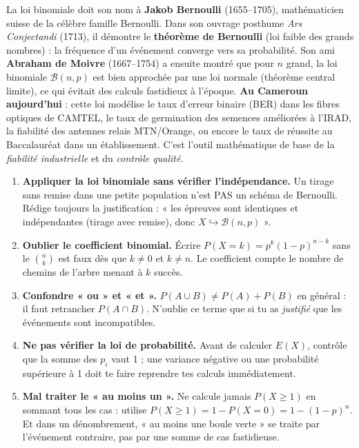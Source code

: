 \documentclass[11pt]{article}
\begin{document}
\begin{savaistu}
La loi binomiale doit son nom à \textbf{Jakob Bernoulli} (1655--1705), mathématicien suisse de la célèbre famille Bernoulli. Dans son ouvrage posthume \emph{Ars Conjectandi} (1713), il démontre le \textbf{théorème de Bernoulli} (loi faible des grands nombres) : la fréquence d'un événement converge vers sa probabilité.
Son ami \textbf{Abraham de Moivre} (1667--1754) a ensuite montré que pour $n$ grand, la loi binomiale $\mathcal{B}(n,p)$ est bien approchée par une loi normale (théorème central limite), ce qui évitait des calculs fastidieux à l'époque.
\textbf{Au Cameroun aujourd'hui} : cette loi modélise le taux d'erreur binaire (BER) dans les fibres optiques de CAMTEL, le taux de germination des semences améliorées à l'IRAD, la fiabilité des antennes relais MTN/Orange, ou encore le taux de réussite au Baccalauréat dans un établissement. C'est l'outil mathématique de base de la \emph{fiabilité industrielle} et du \emph{contrôle qualité}.
\end{savaistu}

\begin{attention}
\begin{enumerate}
\item \textbf{Appliquer la loi binomiale sans vérifier l'indépendance.} Un tirage sans remise dans une petite population n'est PAS un schéma de Bernoulli. Rédige toujours la justification : « les épreuves sont identiques et indépendantes (tirage avec remise), donc $X \hookrightarrow \mathcal{B}(n, p)$ ».
\item \textbf{Oublier le coefficient binomial.} Écrire $P(X = k) = p^k (1-p)^{n-k}$ sans le $\binom{n}{k}$ est faux dès que $k \neq 0$ et $k \neq n$. Le coefficient compte le nombre de chemins de l'arbre menant à $k$ succès.
\item \textbf{Confondre « ou » et « et ».} $P(A \cup B) \neq P(A) + P(B)$ en général : il faut retrancher $P(A \cap B)$. N'oublie ce terme que si tu as \emph{justifié} que les événements sont incompatibles.
\item \textbf{Ne pas vérifier la loi de probabilité.} Avant de calculer $E(X)$, contrôle que la somme des $p_i$ vaut 1 ; une variance négative ou une probabilité supérieure à 1 doit te faire reprendre tes calculs immédiatement.
\item \textbf{Mal traiter le « au moins un ».} Ne calcule jamais $P(X \geq 1)$ en sommant tous les cas : utilise $P(X \geq 1) = 1 - P(X = 0) = 1 - (1-p)^n$. Et dans un dénombrement, « au moins une boule verte » se traite par l'événement contraire, pas par une somme de cas fastidieuse.
\end{enumerate}
\end{attention}
\end{document}

